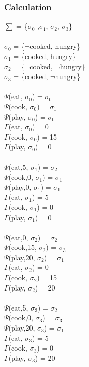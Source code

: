 \documentclass[11pt]{article}
\begin{document}
	\subsubsection{Calculation}\label{par:p303}
	$\sum$ = \{$\sigma_{0}$ ,$\sigma_{1}$, $\sigma_{2}$, $\sigma_{3}$\}\\
	\\
	$\sigma_{0}$ = \{$\neg$cooked, hungry\}\\
	$\sigma_{1}$ = \{cooked, hungry\}\\
	$\sigma_{2}$ = \{$\neg$cooked, $\neg$hungry\}\\
	$\sigma_{3}$ = \{cooked, $\neg$hungry\}\\
	\\
	\(  \Psi  \)(eat, $\sigma_{0}$) = $\sigma_{0}$\\
	\(  \Psi  \)(cook, $\sigma_{0}$) = $\sigma_{1}$\\
	\(  \Psi  \)(play, $\sigma_{0}$) = $\sigma_{0}$\\
	\(\Gamma\)(eat, $\sigma_{0}$) = 0\\
	\(\Gamma\)(cook, $\sigma_{0}$) = 15\\
	\(\Gamma\)(play, $\sigma_{0}$) = 0\\
	\\
	\(  \Psi  \)(eat,5, $\sigma_{1}$) = $\sigma_{2}$\\
	\(  \Psi  \)(cook,0, $\sigma_{1}$) = $\sigma_{1}$\\
	\(  \Psi  \)(play,0, $\sigma_{1}$) = $\sigma_{1}$\\
	\(\Gamma\)(eat, $\sigma_{1}$) = 5\\
	\(\Gamma\)(cook, $\sigma_{1}$) = 0\\
	\(\Gamma\)(play, $\sigma_{1}$) = 0\\
	\\
	\(  \Psi  \)(eat,0, $\sigma_{2}$) = $\sigma_{2}$\\
	\(  \Psi  \)(cook,15, $\sigma_{2}$) = $\sigma_{3}$\\
	\(  \Psi  \)(play,20, $\sigma_{2}$) = $\sigma_{1}$\\
	\(\Gamma\)(eat, $\sigma_{2}$) = 0\\
	\(\Gamma\)(cook, $\sigma_{2}$) = 15\\
	\(\Gamma\)(play, $\sigma_{2}$) = 20\\
	\\
	\(  \Psi  \)(eat,5, $\sigma_{3}$) = $\sigma_{2}$\\
	\(  \Psi  \)(cook,0, $\sigma_{3}$) = $\sigma_{3}$\\
	\(  \Psi  \)(play,20, $\sigma_{3}$) = $\sigma_{1}$\\
	\(\Gamma\)(eat, $\sigma_{3}$) = 5\\
	\(\Gamma\)(cook, $\sigma_{3}$) = 0\\
	\(\Gamma\)(play, $\sigma_{3}$) = 20\\
	\\
\end{document}
